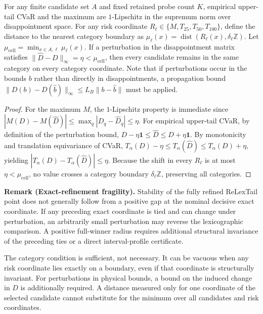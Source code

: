 \begin{theorem}
\label{thm:categorystability}
For any finite candidate set $A$ and fixed retained probe count $K$, empirical upper-tail CVaR and the maximum are $1$-Lipschitz in the supremum norm over disappointment space. 
For any risk coordinate $R_\ell \in \{M, T_{25}, T_{50}, T_{100}\}$, define the distance to the nearest category boundary as $\mu_\ell(x) = \operatorname{dist}(R_\ell(x), \delta_\ell \mathbb{Z})$. Let $\mu_{\mathrm{cell}} = \min_{x\in A, \ell} \mu_\ell(x)$. If a perturbation in the disappointment matrix satisfies $\|\widehat{D} - D\|_\infty = \eta < \mu_{\mathrm{cell}}$, then every candidate remains in the same category on every category coordinate. Note that if perturbations occur in the bounds $b$ rather than directly in disappointments, a propagation bound $\|D(b) - D(\widehat{b})\|_\infty \le L_B \|b - \widehat{b}\|$ must be applied.
\end{theorem}
\begin{proof}
For the maximum $M$, the $1$-Lipschitz property is immediate since $|M(D) - M(\widehat{D})| \leq \max_q |D_q - \widehat{D}_q| \leq \eta$. For empirical upper-tail CVaR, by definition of the perturbation bound, $D - \eta\mathbf{1} \leq \widehat{D} \leq D + \eta\mathbf{1}$. By monotonicity and translation equivariance of CVaR, $T_\alpha(D) - \eta \leq T_\alpha(\widehat{D}) \leq T_\alpha(D) + \eta$, yielding $|T_\alpha(D) - T_\alpha(\widehat{D})| \leq \eta$. Because the shift in every $R_\ell$ is at most $\eta < \mu_{\mathrm{cell}}$, no value crosses a category boundary $\delta_\ell \mathbb{Z}$, preserving all categories.
\end{proof}


\textbf{Remark (Exact-refinement fragility).} Stability of the fully refined ReLexTail point does not generally follow from a positive gap at the nominal decisive exact coordinate. If any preceding exact coordinate is tied and can change under perturbation, an arbitrarily small perturbation may reverse the lexicographic comparison. A positive full-winner radius requires additional structural invariance of the preceding ties or a direct interval-profile certificate.


The category condition is sufficient, not necessary. It can be vacuous when any risk coordinate lies exactly on a boundary, even if that coordinate is structurally invariant. For perturbations in physical bounds, a bound on the induced change in $D$ is additionally required. A distance measured only for one coordinate of the selected candidate cannot substitute for the minimum over all candidates and risk coordinates.

